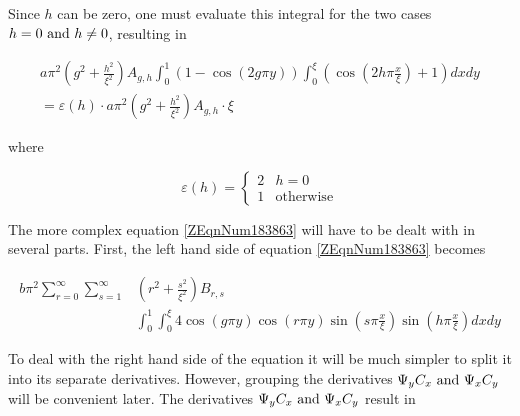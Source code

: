 Since $h$ can be zero, one must evaluate this integral for the two cases
$h = 0 \text{ and } h \ne 0$, resulting in

\begin{equation} \label{3.22)} 
    \begin{array}{l} {a\pi ^{2} \left(g^{2}
    +\frac{h^{2} }{\xi ^{2} } \right)A_{g,h} \int _{0}^{1} \left(1-\cos \left(2g\pi
    y\right)\right)\int _{0}^{\xi } \left(\cos \left(2h\pi \frac{x}{\xi }
    \right)+1\right)dxdy } \\ {=\varepsilon \left(h\right)\cdot a\pi ^{2}
    \left(g^{2} +\frac{h^{2} }{\xi ^{2} } \right)A_{g,h} \cdot \xi } \end{array}
\end{equation}

where

\begin{equation} \label{3.23)} 
    \varepsilon \left(h\right) = \begin{cases}
        2 & h = 0 \\ 
        1 & \text{otherwise}\end{cases} 
\end{equation} 

The more complex equation \eqref{ZEqnNum183863} will have to be dealt with in
several parts. First, the left hand side of equation \eqref{ZEqnNum183863}
becomes

\begin{equation} \label{ZEqnNum189325} \begin{split} 
    b\pi ^{2} \sum _{r=0}^{\infty } \sum_{s=1}^{\infty } 
    & \left(r^{2} + \frac{s^{2} }{\xi^{2} } \right) B_{r,s} \\ 
    & \int_{0}^{1} \int_{0}^{\xi } 4 \cos \left(g \pi y\right) 
    \cos \left(r\pi y\right) \sin\left(s \pi \frac{x}{\xi} \right)
    \sin \left(h \pi \frac{x}{\xi} \right) dxdy
\end{split} \end{equation}

 To deal with the right hand side of the equation it will be much simpler to
 split it into its separate derivatives. However, grouping the derivatives $\Psi
 _{y} C_{x} \text{ and } \Psi _{x} C_{y} $ will be convenient later. The derivatives
 $\Psi _{y} C_{x} \text{ and } \Psi _{x} C_{y} $ result in

